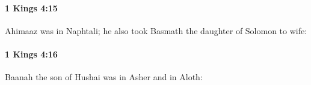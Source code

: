 		\paragraph{1 Kings 4:15} %
			\label{1KINGS-4-15}

			Ahimaaz was in Naphtali; he also took Basmath the daughter of Solomon to wife:


		\paragraph{1 Kings 4:16} %
			\label{1KINGS-4-16}

			Baanah the son of Hushai was in Asher and in Aloth:


